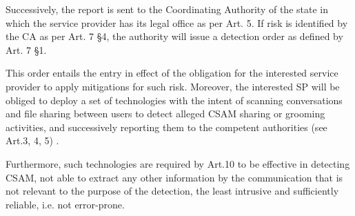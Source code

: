 Successively, the report is sent to the Coordinating Authority of the state in which the service provider has its legal office as per Art. 5. If risk is identified by the CA as per Art. 7 \S 4, the authority will issue a detection order as defined by Art. 7 \S 1. 

This order entails the entry in effect of the obligation for the interested service provider to apply mitigations for such risk. Moreover, the interested SP will be obliged to deploy a set of technologies with the intent of scanning conversations and file sharing between users to detect alleged CSAM sharing or grooming activities, and successively reporting them to the competent authorities (see Art.3, 4, 5) \cite{eu2023chatcontrol}.

Furthermore, such technologies are required by Art.10 to be effective in detecting CSAM, not able to extract any other information by the communication that is not relevant to the purpose of the detection, the least intrusive and sufficiently reliable, i.e. not error-prone.


